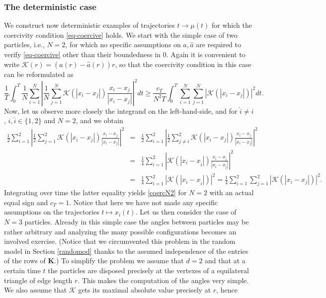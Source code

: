 \subsubsection{The deterministic case}
We construct now  deterministic examples of trajectories $t \to \mu(t)$ for which the  coercivity condition \eqref{eq-coercive} holds.
We start with the simple case of two particles, i.e., $N=2$, for which no specific assumptions on $a,\widehat a$ are required to verify \eqref{eq-coercive} other than their boundedness in $0$. Again it is convenient to write $\mathcal K(r) = (a(r) - \widehat a(r)) r$, so that the coercivity condition in this case can be reformulated as 
\begin{equation}\label{coercN2}
\frac{1}{T} \int_0^T \frac{1}{N} \sum_{i=1}^N \left | \frac{1}{N} \sum_{j=1}^N \mathcal K(|x_i-x_j|) \frac{x_i-x_j}{|x_i-x_j|} \right |^2 dt \geq \frac{c_T}{N^2T} \int_0^T  \sum_{i=1}^N \sum_{j=1}^N |\mathcal K(|x_i-x_j|)|^2  dt.
\end{equation}
Now, let us observe more closely the integrand on the left-hand-side, and for $\widehat i \neq i$, $i,  \widehat i \in \{1,2\}$ and $N=2$, and we obtain
\begin{eqnarray*}
\frac{1}{2} \sum_{i=1}^2 \left | \frac{1}{2} \sum_{j=1}^2 \mathcal K(|x_i-x_j|) \frac{x_i-x_j}{|x_i-x_j|} \right |^2 &=& \frac{1}{2} \sum_{i=1}^2 \left | \frac{1}{2} \sum_{j\neq i}^2 \mathcal K(|x_i-x_j|) \frac{x_i-x_j}{|x_i-x_j|} \right |^2 \\
&=&  \frac{1}{4} \sum_{i=1}^2 \left |  \mathcal K(|x_i-x_{\widehat i}|) \frac{x_i-x_{\widehat i}}{|x_i-x_{\widehat i}|} \right |^2\\
&=& \frac{1}{4} \sum_{i=1}^2 \left |  \mathcal K(|x_i-x_{\widehat i}|) \right |^2=\frac{1}{4}  \sum_{i=1}^2 \sum_{j=1}^2 |\mathcal K(|x_i-x_j|)|^2.
\end{eqnarray*}
Integrating over time the latter equality yields \eqref{coercN2} for $N=2$ with an actual equal sign and $c_T=1$. Notice that here we have not made any specific assumptions on the trajectories $t \mapsto x_i(t)$. 
Let us then consider the case of $N=3$ particles. Already in this simple case the angles between particles may be rather arbitrary and analyzing the many possible configurations becomes an involved exercise. (Notice that we circumvented this problem in the random model in Section \ref{randomod} thanks to the assumed independence of the entries of the rows of $\mathbf K$.)
To simplify the problem we assume that $d=2$  and that at a certain time $t$ the particles are disposed precisely at the vertexes of a equilateral triangle of edge length $r$. This makes the computation of the angles very simple. We also assume that $\mathcal K$ gets its maximal absolute value precisely at $r$, hence
